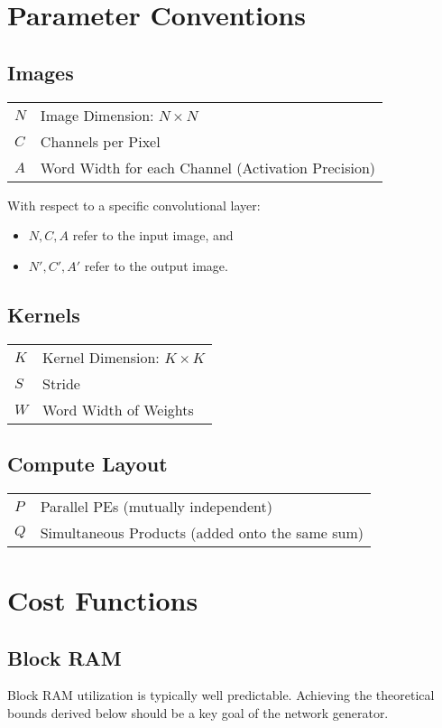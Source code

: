 \documentclass[DIV12]{scrreprt}
\begin{document}
\chapter{Parameter Conventions}

\section{Images}
\begin{tabular}{ll}\toprule
  $N$ & Image Dimension: $N\times N$\\
  $C$ & Channels per Pixel\\
  $A$ & Word Width for each Channel (Activation Precision)\\\bottomrule
\end{tabular}

With respect to a specific convolutional layer:
\begin{itemize}
\item  $N, C, A$ refer to the input image, and
\item  $N', C', A'$ refer to the output image.
\end{itemize}

\section{Kernels}
\begin{tabular}{ll}\toprule
  $K$ & Kernel Dimension: $K\times K$\\
  $S$ & Stride\\
  $W$ & Word Width of Weights\\\bottomrule
\end{tabular}

\section{Compute Layout}
\begin{tabular}{ll}\toprule
  $P$ & Parallel PEs (mutually independent)\\
  $Q$ & Simultaneous Products (added onto the same sum)\\\bottomrule
\end{tabular}

\chapter{Cost Functions}

\section{Block RAM}
Block RAM utilization is typically well predictable. Achieving the
theoretical bounds derived below should be a key goal of the network
generator.
\end{document}
